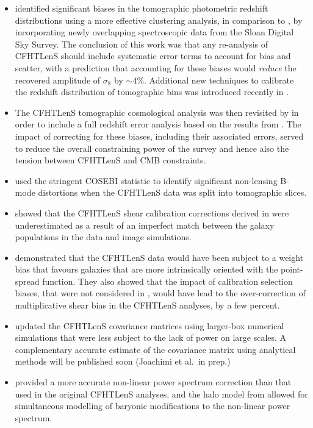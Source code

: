\begin{itemize}
%
 \item{\citet{2016MNRAS.463.3737C} identified significant biases in the tomographic
photometric redshift distributions using a more effective clustering analysis,
in comparison to \citet{CFHTLenS-2pt-tomo}, by incorporating newly overlapping
spectroscopic data from the Sloan Digital Sky Survey.  The conclusion of this
work was that any re-analysis of CFHTLenS should include systematic error terms
to account for bias and scatter, with a prediction that accounting for these
biases would {\it reduce}\/ the recovered amplitude of $\sigma_8$ by $\sim
4$\%. Additional new techniques to calibrate the redshift distribution of tomographic
bins was introduced recently in \cite{KiDS-450}.}
%
\item{The CFHTLenS tomographic cosmological analysis was then revisited by
\citet{joudaki/etal:2016} in order to include a full redshift error analysis
based on the results from \citet{2016MNRAS.463.3737C}.  The impact of
correcting for these biases, including their associated errors, served to
reduce the overall constraining power of the survey and hence also the tension
between CFHTLenS and CMB constraints.}
%
 \item{\cite{asgari/etal:2017} used the stringent COSEBI statistic
\citep{COSEBIs} to identify significant non-lensing B-mode distortions when the
CFHTLenS data was split into tomographic slices.}
%
\item{\citet{2015MNRAS.454.3500K} showed that the CFHTLenS shear calibration
corrections derived in \citet{CFHTLenS-shapes} were underestimated as a result
of an imperfect match between the galaxy populations in the data and image
simulations.}
%
\item{\citet{2016arXiv160605337F} demonstrated that the CFHTLenS data would
have been subject to a weight bias that favours galaxies that are more
intrinsically oriented with the point-spread function.  They also showed that
the impact of calibration selection biases, that were not considered in
\citet{CFHTLenS-shapes}, would have lead to the over-correction of
multiplicative shear bias in the CFHTLenS analyses, by a few percent.}
%
\item{\citet{joudaki/etal:2016} updated the CFHTLenS covariance matrices using
larger-box numerical simulations that were less subject to the lack of power on
large scales. A complementary accurate estimate of the covariance matrix using
analytical methods will be published soon (Joachimi et al.~in prep.)}
\item{\cite{2012ApJ...761..152T} provided a more accurate non-linear power
spectrum correction than that used in the original CFHTLenS analyses, and the
halo model from \cite{2015MNRAS.454.1958M} allowed for simultaneous modelling
of baryonic modifications to the non-linear power spectrum.} 
%
\end{itemize}
